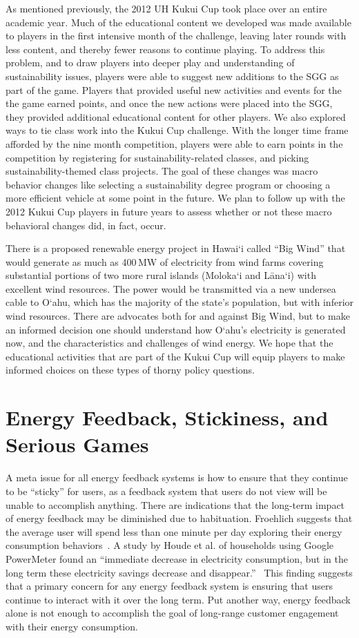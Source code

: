 \documentclass[10pt, conference, compsocconf]{IEEEtran-old}
\newcommand{\Hawaii}{Hawai`i\xspace}
\begin{document}
As mentioned previously, the 2012 UH Kukui Cup took place over an entire academic year. Much of the educational content we developed was made available to players in the first intensive month of the challenge, leaving later rounds with less content, and thereby fewer reasons to continue playing. To address this problem, and to draw players into deeper play and understanding of sustainability issues, players were able to suggest new additions to the SGG as part of the game. Players that provided useful new activities and events for the the game earned points, and once the new actions were placed into the SGG, they provided additional educational content for other players. We also explored ways to tie class work into the Kukui Cup challenge. With the longer time frame afforded by the nine month competition, players were able to earn points in the competition by registering for sustainability-related classes, and picking sustainability-themed class projects. The goal of these changes was macro behavior changes like selecting a sustainability degree program or choosing a more efficient vehicle at some point in the future. We plan to follow up with the 2012 Kukui Cup players in future years to assess whether or not these macro behavioral changes did, in fact, occur.

There is a proposed renewable energy project in \Hawaii called ``Big Wind'' that would generate as much as 400\,MW of electricity from wind farms covering substantial portions of two more rural islands (Moloka`i and L\=ana`i) with excellent wind resources. The power would be transmitted via a new undersea cable to O`ahu, which has the majority of the state's population, but with inferior wind resources. There are advocates both for and against Big Wind, but to make an informed decision one should understand how O`ahu's electricity is generated now, and the characteristics and challenges of wind energy. We hope that the educational activities that are part of the Kukui Cup will equip players to make informed choices on these types of thorny policy questions.


\section{Energy Feedback, Stickiness, and Serious Games}

A meta issue for all energy feedback systems is how to ensure that they continue to be ``sticky'' for users, as a feedback system that users do not view will be unable to accomplish anything. There are indications that the long-term impact of energy feedback may be diminished due to habituation. Froehlich suggests that the average user will spend less than one minute per day exploring their energy consumption behaviors~\cite{Froehlich2010-BECC}. A study by Houde et al. of households using Google PowerMeter found an ``immediate decrease in electricity consumption, but in the long term these electricity savings decrease and disappear.''~\cite{Houde2013-powermeter} This finding suggests that a primary concern for any energy feedback system is ensuring that users continue to interact with it over the long term. Put another way, energy feedback alone is not enough to accomplish the goal of long-range customer engagement with their energy consumption.
\end{document}
